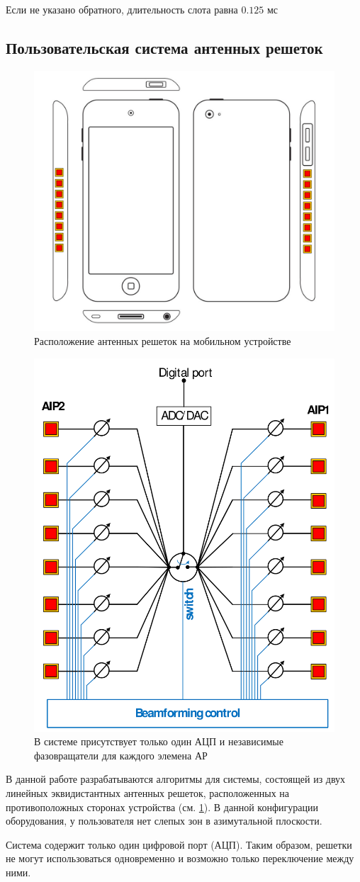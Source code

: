 Если не указано обратного, длительность слота равна $0.125$ мс
\subsection{Пользовательская система антенных решеток}

\begin{figure}[ht]
    \centering
    \includegraphics[width=0.5\linewidth]{figs/fig4.3}
    \caption{Расположение антенных решеток на мобильном устройстве}
    \label{fig:4.3}
\end{figure}

\begin{figure}[ht]
    \centering
    \includegraphics[width=0.4\linewidth]{figs/fig4.4}
    \caption{В системе присутствует только один АЦП и независимые фазовращатели для каждого элемена АР}
    \label{fig:4.4}
\end{figure}

В данной работе разрабатываются алгоритмы для системы, состоящей из двух линейных эквидистантных антенных решеток, расположенных на противоположных сторонах
устройства (см. \ref{fig:4.3}). В данной конфигурации оборудования, у пользователя нет слепых зон в азимутальной плоскости.

Система содержит только один цифровой порт (АЦП). Таким образом, решетки не могут
использоваться одновременно и возможно только переключение между ними.

